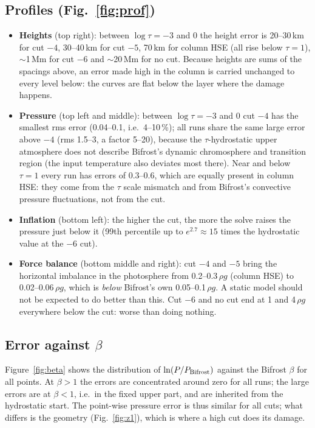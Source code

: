 \subsection{Profiles (Fig.~\ref{fig:prof})}
\begin{itemize}
\item \textbf{Heights} (top right): between $\log\tau=-3$ and $0$ the height error is 20--30\,km for cut $-4$, 30--40\,km for
cut $-5$, 70\,km for column HSE (all rise below $\tau=1$), $\sim$1\,Mm for cut $-6$ and $\sim$20\,Mm for no cut. Because heights are sums of the
spacings above, an error made high in the column is carried unchanged to every level below: the curves are flat below the
layer where the damage happens.
\item \textbf{Pressure} (top left and middle): between $\log\tau=-3$ and $0$ cut $-4$ has the smallest rms error
(0.04--0.1, i.e.\ 4--10\,\%); all runs share the same large error above $-4$ (rms 1.5--3, a factor 5--20), because the
$\tau$-hydrostatic upper atmosphere does not describe Bifrost's dynamic chromosphere and transition region (the input
temperature also deviates most there). Near and below $\tau=1$ every run has errors of 0.3--0.6, which are equally present in
column HSE: they come from the $\tau$ scale mismatch and from Bifrost's convective pressure fluctuations, not from the cut.
\item \textbf{Inflation} (bottom left): the higher the cut, the more the solve raises the pressure just below it (99th
percentile up to $e^{2.7}\approx15$ times the hydrostatic value at the $-6$ cut).
\item \textbf{Force balance} (bottom middle and right): cut $-4$ and $-5$ bring the horizontal imbalance in the photosphere
from 0.2--0.3\,$\rho g$ (column HSE) to 0.02--0.06\,$\rho g$, which is \emph{below} Bifrost's own 0.05--0.1\,$\rho g$.
A static model should not be expected to do better than this. Cut $-6$ and no cut end at 1 and 4\,$\rho g$ everywhere below
the cut: worse than doing nothing.
\end{itemize}

\subsection{Error against \texorpdfstring{$\beta$}{beta}}
Figure~\ref{fig:beta} shows the distribution of $\ln(P/P_{\rm Bifrost})$ against the Bifrost $\beta$ for all points. At
$\beta>1$ the errors are concentrated around zero for all runs; the large errors are at $\beta<1$, i.e.\ in the fixed
upper part, and are inherited from the hydrostatic start. The point-wise pressure error is thus similar for all cuts; what
differs is the geometry (Fig.~\ref{fig:z1}), which is where a high cut does its damage.

